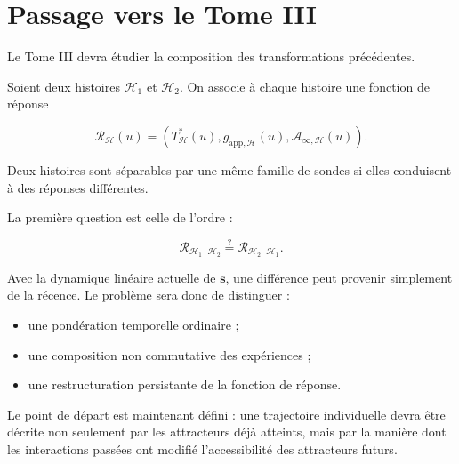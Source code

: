 \chapter{Passage vers le Tome III}\label{t2-passage-vers-le-tome-iii}

Le Tome III devra étudier la composition des transformations
précédentes.

Soient deux histoires \(\mathcal H_1\) et \(\mathcal H_2\). On associe à
chaque histoire une fonction de réponse

\[
\mathcal R_{\mathcal H}(u)
=
\left(
T^\ast_{\mathcal H}(u),
g_{\mathrm{app},\mathcal H}(u),
\mathcal A_{\infty,\mathcal H}(u)
\right).
\]

Deux histoires sont séparables par une même famille de sondes si elles conduisent à des réponses différentes.

La première question est celle de l'ordre :

\[
\mathcal R_{\mathcal H_1\cdot\mathcal H_2}
\stackrel{?}{=}
\mathcal R_{\mathcal H_2\cdot\mathcal H_1}.
\]

Avec la dynamique linéaire actuelle de \(\mathbf s\), une différence
peut provenir simplement de la récence. Le problème sera donc de
distinguer :

\begin{itemize}
\tightlist
\item
  une pondération temporelle ordinaire ;
\item
  une composition non commutative des expériences ;
\item
  une restructuration persistante de la fonction de réponse.
\end{itemize}

Le point de départ est maintenant défini : une trajectoire individuelle
devra être décrite non seulement par les attracteurs déjà atteints, mais
par la manière dont les interactions passées ont modifié l'accessibilité
des attracteurs futurs.